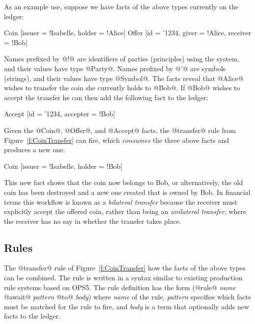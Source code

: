 As an example use, suppose we have facts of the above types currently on the ledger:
\begin{small}
\begin{code}
 Coin   [issuer = !Isabelle, holder = !Alice]
 Offer  [id = '1234, giver = !Alice, receiver = !Bob]
\end{code}
\end{small}

Names prefixed by @!@ are identifiers of parties (principles) using the system, and their values have type @Party@. Names prefixed by @'@ are symbols (strings), and their values have type @Symbol@. The facts reveal that @Alice@ wishes to transfer the coin she currently holds to @Bob@. If @Bob@ wishes to accept the transfer he can then add the following fact to the ledger:
\begin{small}
\begin{code}
 Accept [id = '1234, accepter = !Bob]
\end{code}
\end{small}

Given the @Coin@, @Offer@, and @Accept@ facts, the @transfer@ rule from Figure~\ref{f:CoinTransfer} can fire, which \emph{consumes} the three above facts and produces a new one:
\begin{small}
\begin{code}
 Coin [issuer = !Isabelle, holder = !Bob]
\end{code}
\end{small}

This new fact shows that the coin now belongs to Bob, or alternatively, the old coin has been destroyed and a new one created that is owned by Bob. In financial terms this workflow is known as a \emph{bilateral transfer} because the receiver must explicitly accept the offered coin, rather than being an \emph{unilateral transfer}, where the receiver has no say in whether the transfer takes place.


\subsection{Rules}
The @transfer@ rule of Figure~\ref{f:CoinTransfer} how the facts of the above types can be combined. The rule is written in a syntax similar to existing production rule systems based on OPS5. The rule definition has the form (@rule@ \emph{name} @await@ \emph{pattern} @to@ \emph{body}) where \emph{name} of the rule, \emph{pattern} specifies which facts must be matched for the rule to fire, and \emph{body} is a term that optionally adds new facts to the ledger.


